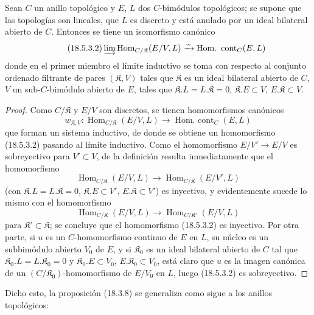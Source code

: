 \begin{lemma}[18.5.3.1]
\label{0.18.5.3.1-es}
Sean $C$ un anillo topológico y $E$, $L$ dos $C$-bimódulos topológicos;
se supone que las topologías son lineales, que $L$ es discreto y está anulado
por un ideal bilateral abierto de $C$. Entonces se tiene un isomorfismo canónico
\begin{equation}
\label{0.18.5.3.2-es}
\tag{18.5.3.2}
  \varinjlim\operatorname{Hom}_{C/\mathfrak K}(E/V,L)
  \xrightarrow{\sim}\operatorname{Hom.\ cont}_C(E,L)
\end{equation}
donde en el primer miembro el límite inductivo se toma con respecto al conjunto
ordenado filtrante de pares $(\mathfrak K,V)$ tales que $\mathfrak K$ es un
ideal bilateral abierto de $C$, $V$ un sub-$C$-bimódulo abierto de $E$, tales que
$\mathfrak K.L=L.\mathfrak K=0$, $\mathfrak K.E\subset V$,
$E.\mathfrak K\subset V$.
\end{lemma}

\begin{proof}
Como $C/\mathfrak K$ y $E/V$ son discretos, se tienen homomorfismos
canónicos
\[
  w_{\mathfrak K,V}:\operatorname{Hom}_{C/\mathfrak K}(E/V,L)
  \longrightarrow\operatorname{Hom.\ cont}_C(E,L)
\]
que forman un sistema inductivo, de donde se obtiene un homomorfismo (18.5.3.2) pasando al
límite inductivo. Como el homomorfismo $E/V'\to E/V$ es sobreyectivo para
$V'\subset V$, de la definición resulta inmediatamente que el homomorfismo
\[
  \operatorname{Hom}_{C/\mathfrak K}(E/V,L)
  \longrightarrow\operatorname{Hom}_{C/\mathfrak K}(E/V',L)
\]
(con $\mathfrak K.L=L.\mathfrak K=0$, $\mathfrak K.E\subset V'$,
$E.\mathfrak K\subset V'$) es inyectivo, y evidentemente sucede lo mismo con
el homomorfismo
\[
  \operatorname{Hom}_{C/\mathfrak K}(E/V,L)
  \longrightarrow\operatorname{Hom}_{C/\mathfrak K'}(E/V,L)
\]
para $\mathfrak K'\subset\mathfrak K$; se concluye que el homomorfismo
(18.5.3.2) es inyectivo. Por otra parte, si $u$ es un $C$-homomorfismo continuo
de $E$ en $L$, su núcleo es un subbimódulo abierto $V_0$ de $E$, y si
$\mathfrak K_0$ es un ideal bilateral abierto de $C$ tal que
$\mathfrak K_0.L=L.\mathfrak K_0=0$ y $\mathfrak K_0.E\subset V_0$,
$E.\mathfrak K_0\subset V_0$, está claro que $u$ es la imagen canónica de un
$(C/\mathfrak K_0)$-homomorfismo de $E/V_0$ en $L$, luego (18.5.3.2) es
sobreyectivo.
\end{proof}

Dicho esto, la proposición (18.3.8) se generaliza como sigue a los anillos
topológicos:

